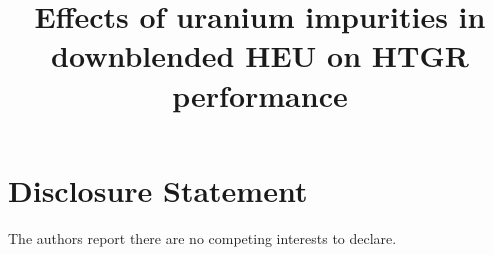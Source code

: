 \documentclass[review]{nseJournal}
\begin{document}
\title{Effects of uranium impurities in downblended HEU on  
HTGR performance}




%

\titlePage


\linenumbers







\section*{Disclosure Statement}
The authors report there are no competing interests 
to declare. 




%
\end{document}

